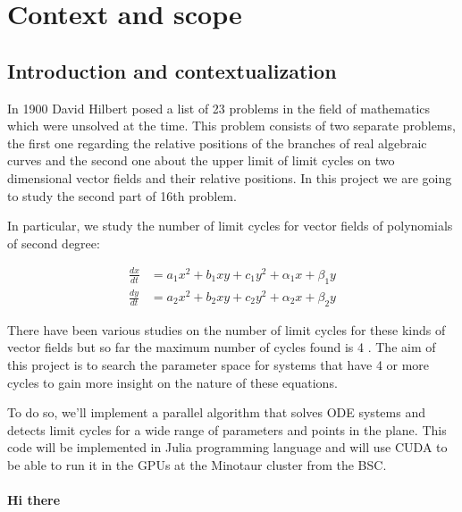 
\section{Context and scope}%
\label{sec:context}

\subsection{Introduction and contextualization}

In 1900 David Hilbert posed a list of 23 problems in the field of mathematics
which were unsolved at the time.  This problem consists of two separate
problems, the first one regarding the relative positions of the branches of real
algebraic curves and the second one about the upper limit of limit cycles on two
dimensional vector fields and their relative positions. In this project we are
going to study the second part of 16th problem.

In particular, we study the number of limit cycles for vector fields of
polynomials of second degree:

\begin{align}
    \frac{dx}{dt} &= a_1x^2 + b_1xy + c_1y^2 + \alpha_1x + \beta_1y \\
    \frac{dy}{dt} &= a_2x^2 + b_2xy + c_2y^2 + \alpha_2x + \beta_2y
\end{align}

There have been various studies on the number of limit cycles for these kinds of
vector fields but so far the maximum number of cycles found is 4 \cite{kuznetsov_visualization_2013}. The aim of
this project is to search the parameter space for systems that have 4 or more
cycles to gain more insight on the nature of these equations.

To do so, we'll implement a parallel algorithm that solves ODE systems and
detects limit cycles for a wide range of parameters and points in the plane.
This code will be implemented in Julia programming language and will use CUDA
to be able to run it in the GPUs at the Minotaur cluster from the BSC.

\newcommand{\myparagraph}[1]{\paragraph{#1}\mbox{}\\}

\myparagraph{Hi there}

